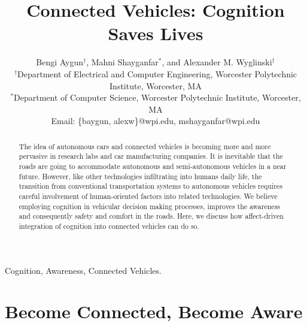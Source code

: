 \documentclass[journal, 11pt]{IEEEtran}
\begin{document}
\title{Connected Vehicles: Cognition Saves Lives}

\author{Bengi Aygun$^\dag$, Mahni Shayganfar$^*$, and Alexander M.
Wyglinski$^\dag$\\
\normalsize $^\dag$Department of Electrical and Computer Engineering, Worcester
Polytechnic Institute, Worcester, MA\\
\normalsize $^*$Department of Computer Science, Worcester Polytechnic Institute,
Worcester, MA\\
\normalsize Email: \{baygun, alexw\}@wpi.edu, mshayganfar@wpi.edu}

\maketitle

\begin{abstract}
The idea of autonomous cars and connected vehicles is becoming more and more
pervasive in research labs and car manufacturing companies. It is inevitable
that the roads are going to accommodate autonomous and semi-autonomous vehicles
in a near future. However, like other technologies infiltrating into humans
daily life, the transition from conventional transportation systems to
autonomous vehicles requires careful involvement of human-oriented factors into
related technologies. We believe employing cognition in vehicular decision
making processes, improves the awareness and consequently safety and comfort in
the roads. Here, we discuss how affect-driven integration of cognition into
connected vehicles can do so.
\end{abstract}

\begin{keywords}
Cognition, Awareness, Connected Vehicles.
\end{keywords}%

\IEEEpeerreviewmaketitle

\section{Become Connected, Become Aware}
\end{document}
